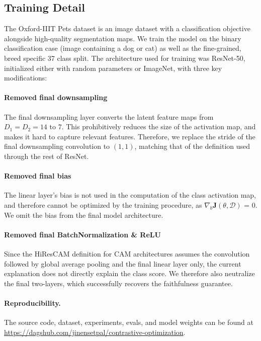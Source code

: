 \documentclass{article}
\theoremstyle{plain}
\theoremstyle{definition}
\theoremstyle{remark}
\begin{document}
\subsection{Training Detail}


The Oxford-IIIT Pets dataset is an image dataset with a classification objective alongside high-quality segmentation maps. We train the model on the binary classification case (image containing a dog or cat) as well as the fine-grained, breed specific 37 class split. The architecture used for training was ResNet-50, initialized either with random parameters or ImageNet, with three key modifications:

\paragraph{Removed final downsampling} The final downsampling layer converts the latent feature maps from $D_1 = D_2 = 14$ to $7$. This prohibitively reduces the size of the activation map, and makes it hard to capture relevant features. Therefore, we replace the stride of the final downsampling convolution to $(1,1)$, matching that of the definition used through the rest of ResNet. 

\paragraph{Removed final bias} The linear layer's bias is not used in the computation of the class activation map, and therefore cannot be optimized by the training procedure, as $\nabla_b \mathcal{\bm{J}}(\theta, \mathcal{D})$ = 0. We omit the bias from the final model architecture.

\paragraph{Removed final BatchNormalization \& ReLU} Since the HiResCAM definition for CAM architectures assumes the convolution followed by global average pooling and the final linear layer only, the current explanation does not directly explain the class score. We therefore also neutralize the final two-layers, which successfully recovers the faithfulness guarantee.

\paragraph{Reproducibility.} The source code, dataset, experiments, evals, and model weights can be found at \url{https://dagshub.com/jinensetpal/contrastive-optimization}.
\end{document}
